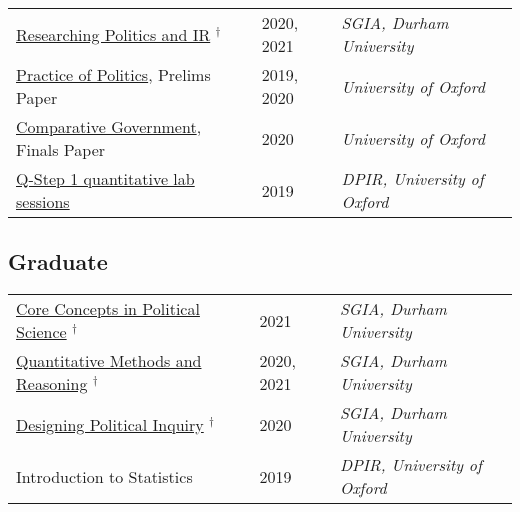 \documentclass[11pt, a4paper]{article}
\begin{document}
  \begin{tabular}{p{}p{}p{}}
      \href{https://www.dur.ac.uk/faculty.handbook/module_description/?year=2021&module_code=SGIA1201}{Researching Politics and IR}  $^\dagger$ & 2020, 2021 & \textit{SGIA, Durham University}\\
      \href{https://www.ox.ac.uk/admissions/undergraduate/courses-listing/philosophy-politics-and-economics}{Practice of Politics}, Prelims Paper & 2019, 2020 & \textit{University of Oxford}\\
      \href{https://www.ox.ac.uk/admissions/undergraduate/courses-listing/philosophy-politics-and-economics}{Comparative Government}, Finals Paper & 2020 & \textit{University of Oxford} \\
      \href{https://www.oqc.ox.ac.uk/resources/teaching#collapse2365056}{Q-Step 1 quantitative lab sessions} & 2019 & \textit{DPIR, University of Oxford} \\
      
  \end{tabular}
  \vspace{-1em}

  \subsection*{Graduate}
  \begin{tabular}{p{}p{}p{}}
      \href{https://www.dur.ac.uk/postgraduate.modules/module_description/?year=2021&module_code=SGIA48030}{Core Concepts in Political Science} $^\dagger$ & 2021 & \textit{SGIA, Durham University} \\
      \href{https://www.dur.ac.uk/postgraduate.modules/module_description/?year=2021&module_code=SGIA49915}{Quantitative Methods and Reasoning}  $^\dagger$ & 2020, 2021 & \textit{SGIA, Durham University} \\
      \href{https://www.dur.ac.uk/postgraduate.modules/module_description/?year=2021&module_code=SGIA48930}{Designing Political Inquiry}  $^\dagger$ & 2020 & \textit{SGIA, Durham University} \\
      Introduction to Statistics & 2019 & \textit{DPIR, University of Oxford} \\
  \end{tabular}
  \vspace{-1em}
\end{document}
